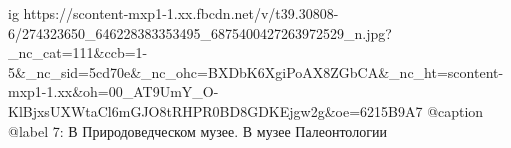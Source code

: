  
 
 
 
 

\ifcmt
  ig https://scontent-mxp1-1.xx.fbcdn.net/v/t39.30808-6/274323650_646228383353495_6875400427263972529_n.jpg?_nc_cat=111&ccb=1-5&_nc_sid=5cd70e&_nc_ohc=BXDbK6XgiPoAX8ZGbCA&_nc_ht=scontent-mxp1-1.xx&oh=00_AT9UmY_O-KlBjxsUXWtaCl6mGJO8tRHPR0BD8GDKEjgw2g&oe=6215B9A7
  @caption @label 7: В Природоведческом музее. В музее Палеонтологии
\fi
